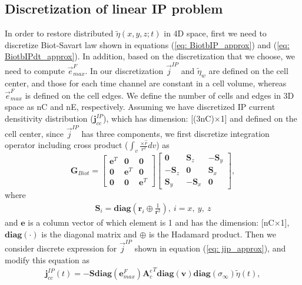 \documentclass[a4paper, 11pt]{article}
\newcommand{\siginf}{\sigma_\infty}
\newcommand{\Ace}{{\mathbf A_c^e}}
\newcommand{\diag}{\mathbf{diag}}
\renewcommand {\j}  { {\vec j} }
\newcommand {\e}  { {\vec e} }
\renewcommand {\dj}  { {\mathbf{j} } }
\newcommand {\de}  { {\mathbf{e} } }
\newcommand{\vol}{\mathbf{v}}
\newcommand{\peta}{\tilde{\eta}}
\begin{document}
\subsection{Discretization of linear IP problem}
In order to restore distributed $\peta(x, y, z; t)$ in 4D space, first we need to discretize Biot-Savart law shown in equations (\ref{eq: BiotbIP_approx}) and (\ref{eq: BiotbIPdt_approx}). In addition, based on the discretization that we choose, we need to compute $\e^{F}_{max}$. In our discretization $\j^{IP}$ and  $\tilde{\eta}_w$ are defined on the cell center, and those for each time channel are constant in a cell volume, whereas $\e^{F}_{max}$ is defined on the cell edges. We define the number of cells and edges in 3D space as nC and nE, respectively. Assuming we have discretized IP current densitivity distribution ($\dj^{IP}_{cc}$), which has dimension: [(3nC)$\times$1] and defined on the cell center, since $\j^{IP}$ has three components, we first discretize integration operator including cross product ($\int_{v}\frac{ \times \hat{r}}{r^2}dv$) as
\begin{equation}
  \mathbf{G}_{Biot} =
  \begin{bmatrix}
       \mathbf{e}^T &  \mathbf{0}   & \mathbf{0}  \\
       \mathbf{0}   &  \mathbf{e}^T & \mathbf{0}  \\
       \mathbf{0}   &  \mathbf{0}   & \mathbf{e}^T
    \end{bmatrix}
  \begin{bmatrix}
       \mathbf{0}     &   \mathbf{S}_z   & -\mathbf{S}_y  \\
      -\mathbf{S}_z   &   \mathbf{0}     &  \mathbf{S}_x  \\
       \mathbf{S}_y   &  -\mathbf{S}_x   &  \mathbf{0}
    \end{bmatrix},
 \end{equation}
where
\begin{eqnarray*}
  \mathbf{S}_i =\diag(\mathbf{r}_i \oplus \frac{1}{\mathbf{r}^2}), \ i = x, \ y, \ z
\end{eqnarray*}
and $\mathbf{e}$ is a column vector of which element is 1 and has the dimension: [nC$\times$1], $\diag(\cdot)$ is the diagonal matrix and $\oplus$ is the Hadamard product. Then we consider discrete expression for $\j^{IP}$ shown in equation (\ref{eq: jip_approx}), and modify this equation as
\begin{eqnarray}
  \dj^{IP}_{cc}(t) = -\mathbf{S}\diag(\de^{F}_{max})\Ace^T\diag(\vol)\diag(\siginf)\peta(t),
\end{eqnarray}
\end{document}
